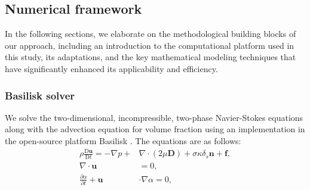 \documentclass[final,3p,times,twocolumn,authoryear]{elsarticle}
\theoremstyle{definition}
\begin{document}
\subsection{Numerical framework}
In the following sections, we elaborate on the methodological building blocks of our approach, including an introduction to the computational platform used in this study, its adaptations, and the key mathematical modeling techniques that have significantly enhanced its applicability and efficiency.

\subsubsection{Basilisk solver}

We solve the two-dimensional, incompressible, two-phase Navier-Stokes equations along with the advection equation for volume fraction using an implementation in the open-source platform Basilisk \citep{Popinet2003,Popinet2009,Popinet2015}. The equations are as follows:
\begin{equation}
    \begin{split}
        \rho \frac{\mathrm{D} \mathbf{u}}{\mathrm{D} t} = -\nabla p + & \nabla \cdot \left( 2\mu\mathbf{D}\right) + \sigma\kappa\delta_s\mathbf{n} + \mathbf{f}, \\
        \nabla \cdot \mathbf{u} & = 0, \\
        \frac{\partial \alpha}{\partial t} + \mathbf{u} & \cdot \nabla \alpha = 0, \label{eq:NS-inertial}
    \end{split}
\end{equation}
\end{document}
